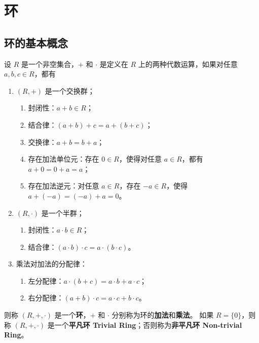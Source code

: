 \section{环}

\subsection{环的基本概念}
\begin{definition}[环 Ring]
    设 $R$ 是一个非空集合，$+$ 和 $\cdot$ 是定义在 $R$ 上的两种代数运算，如果对任意 $a,b,c \in R$，都有
    \begin{enumerate}
        \item $(R,+)$ 是一个交换群；
            \begin{enumerate}
                \item 封闭性：$a+b \in R$；
                \item 结合律：$(a+b)+c=a+(b+c)$；
                \item 交换律：$a+b=b+a$；
                \item 存在加法单位元：存在 $0 \in R$，使得对任意 $a \in R$，都有 $a+0=0+a=a$；
                \item 存在加法逆元：对任意 $a \in R$，存在 $-a \in R$，使得 $a+(-a)=(-a)+a=0$。
            \end{enumerate}
        \item $(R,\cdot)$ 是一个半群；
            \begin{enumerate}
                \item 封闭性：$a \cdot b \in R$；
                \item 结合律：$(a \cdot b) \cdot c=a \cdot (b \cdot c)$。
            \end{enumerate}
        \item 乘法对加法的分配律：
            \begin{enumerate}
                \item 左分配律：$a \cdot (b+c)=a \cdot b + a \cdot c$；
                \item 右分配律：$(a+b) \cdot c=a \cdot c + b \cdot c$。
            \end{enumerate}
    \end{enumerate}
    则称 $(R,+,\cdot)$ 是一个\textbf{环}，$+$ 和 $\cdot$ 分别称为环的\textbf{加法}和\textbf{乘法}。
    如果 $R=\{0\}$，则称 $(R,+,\cdot)$ 是一个\textbf{平凡环 Trivial Ring}；否则称为\textbf{非平凡环 Non-trivial Ring}。
    \label{def:ring}
\end{definition}

